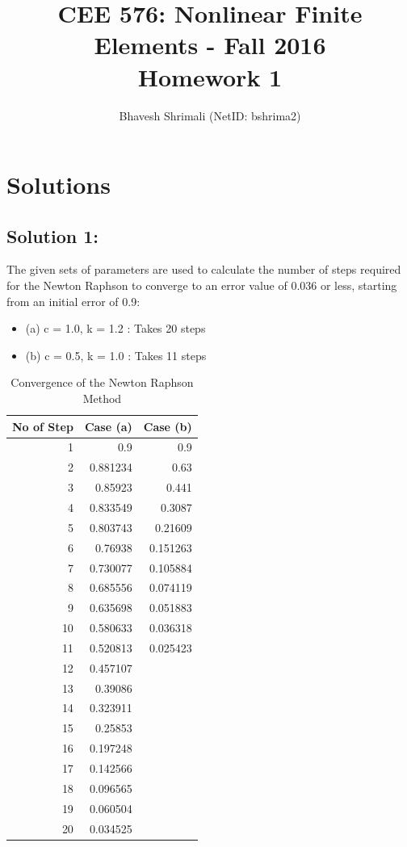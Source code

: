 \documentclass[11pt]{article}
\title{\bf CEE 576: Nonlinear Finite Elements - Fall 2016 \\ Homework 1}
\author{Bhavesh Shrimali (NetID: bshrima2)}
\begin{document}
\maketitle
\section*{Solutions}
\subsection*{Solution 1:}
The given sets of parameters are used to calculate the number of steps required for the Newton Raphson to converge to an error value of 0.036 or less, starting from an initial error of 0.9:
\begin{itemize}
\item (a) c = 1.0, k = 1.2 : Takes 20 steps\\
\item (b) c = 0.5, k = 1.0 : Takes 11 steps
\end{itemize}
\begin{table}[htbp]
  \centering
      \caption{Convergence of the Newton Raphson Method}    
    \begin{tabular}{rrr} 
    \\ \toprule
    \multicolumn{1}{l}{No of Step} & \multicolumn{1}{l}{Case (a) } & \multicolumn{1}{l}{Case (b)} \\
    \midrule
    1     & 0.9   & 0.9 \\
    2     & 0.881234 & 0.63 \\
    3     & 0.85923 & 0.441 \\
    4     & 0.833549 & 0.3087 \\
    5     & 0.803743 & 0.21609 \\
    6     & 0.76938 & 0.151263 \\
    7     & 0.730077 & 0.105884 \\
    8     & 0.685556 & 0.074119 \\
    9     & 0.635698 & 0.051883 \\
    10    & 0.580633 & 0.036318 \\
    11    & 0.520813 & 0.025423 \\
    12    & 0.457107 &  \\
    13    & 0.39086 &  \\
    14    & 0.323911 &  \\
    15    & 0.25853 &  \\
    16    & 0.197248 &  \\
    17    & 0.142566 &  \\
    18    & 0.096565 &  \\
    19    & 0.060504 &  \\
    20    & 0.034525 &  \\
    \bottomrule
    \end{tabular}
  \label{NewtRaph}%
\end{table}%
\end{document}
